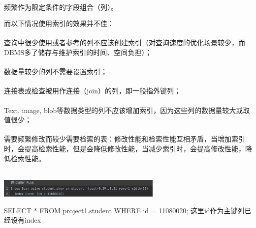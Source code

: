 \paragraph{} 频繁作为限定条件的字段组合（列）。

\par 而以下情况使用索引的效果并不佳：
\vspace{-1.5em}
\paragraph{} 查询中很少使用或者参考的列不应该创建索引（对查询速度的优化场景较少，而DBMS多了储存与维护索引的时间、空间负担）；
\vspace{-1.5em}
\paragraph{} 数据量较少的列不需要设置索引；
\vspace{-1.5em}
\paragraph{} 连接表或检查被用作连接（join）的列，即一般指外键列；
\vspace{-1.5em}
\paragraph{} Text, image, blob等数据类型的列不应该增加索引，因为这些列的数据量较大或取值很少；
\vspace{-1.5em}
\paragraph{} 需要频繁修改而较少需要检索的表：修改性能和检索性能互相矛盾，当增加索引时，会提高检索性能，但是会降低修改性能，当减少索引时，会提高修改性能，降低检索性能。\\~\\
\centerline{\includegraphics[width=0.6\textwidth]{sp/idx}}
\scriptsize
\centerline{SELECT * FROM project1.student WHERE id = 11080020; 这里id作为主键列已经设有index}
\normalsize

